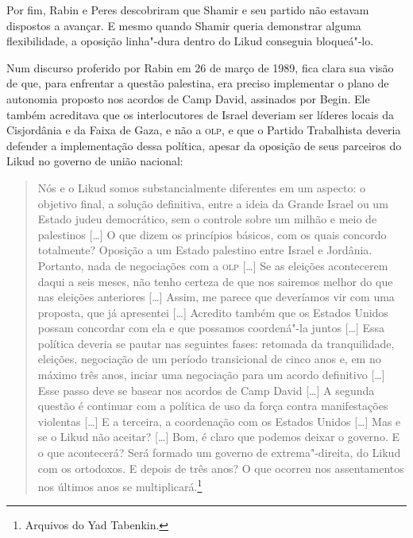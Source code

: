 Por fim, Rabin e Peres descobriram que Shamir e seu partido não estavam
dispostos a avançar. E mesmo quando Shamir queria demonstrar alguma
flexibilidade, a oposição linha"-dura dentro do Likud conseguia
bloqueá"-lo.

Num discurso proferido por Rabin em 26 de março de 1989, fica clara sua
visão de que, para enfrentar a questão palestina, era preciso implementar
o plano de autonomia proposto nos acordos de Camp David, assinados por
Begin. Ele também acreditava que os interlocutores de Israel deveriam
ser líderes locais da Cisjordânia e da Faixa de Gaza, e não a \textsc{olp}, e que
o Partido Trabalhista deveria defender a implementação dessa política,
apesar da oposição de seus parceiros do Likud no governo de união
nacional:

\begin{quote}
Nós e o Likud somos substancialmente diferentes em um aspecto: o
objetivo final, a solução definitiva, entre a ideia da Grande Israel ou
um Estado judeu democrático, sem o controle sobre um milhão e meio de
palestinos {[}\ldots{}{]} O que dizem os princípios básicos, com os quais concordo
totalmente? Oposição a um Estado palestino entre Israel e Jordânia.
Portanto, nada de negociações com a \textsc{olp} {[}\ldots{}{]} Se as eleições acontecerem
daqui a seis meses, não tenho certeza de que nos sairemos melhor do que
nas eleições anteriores {[}\ldots{}{]} Assim, me parece que deveríamos vir com uma
proposta, que já apresentei {[}\ldots{}{]} Acredito também que os Estados Unidos
possam concordar com ela e que possamos coordená"-la juntos {[}\ldots{}{]} Essa
política deveria se pautar nas seguintes fases: retomada da
tranquilidade, eleições, negociação de um período transicional de cinco
anos e, em no máximo três anos, inciar uma negociação para um acordo
definitivo {[}\ldots{}{]} Esse passo deve se basear nos acordos de Camp David
{[}\ldots{}{]} A
segunda questão é continuar com a política de uso da força contra
manifestações violentas {[}\ldots{}{]} E a terceira, a coordenação com os Estados
Unidos {[}\ldots{}{]} Mas e se o Likud não aceitar? {[}\ldots{}{]} Bom, é claro que podemos
deixar o governo. E o que acontecerá? Será formado um governo de
extrema"-direita, do Likud com os ortodoxos. E depois de três anos? O que
ocorreu nos assentamentos nos últimos anos se multiplicará.\footnote{Arquivos do
  Yad Tabenkin.}
\end{quote}

